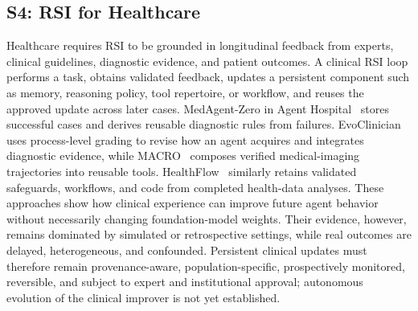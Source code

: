 \subsection{S4: RSI for Healthcare}
\label{subsec:healthcare-main}

Healthcare requires RSI to be grounded in longitudinal feedback from experts, clinical guidelines, diagnostic evidence, and patient outcomes. A clinical RSI loop performs a task, obtains validated feedback, updates a persistent component such as memory, reasoning policy, tool repertoire, or workflow, and reuses the approved update across later cases. MedAgent-Zero in Agent Hospital~\cite{li2024agenthospital} stores successful cases and derives reusable diagnostic rules from failures. EvoClinician~\cite{he2026evoclinician} uses process-level grading to revise how an agent acquires and integrates diagnostic evidence, while MACRO~\cite{fan2026macro} composes verified medical-imaging trajectories into reusable tools. HealthFlow~\cite{zhu2026healthflow} similarly retains validated safeguards, workflows, and code from completed health-data analyses. These approaches show how clinical experience can improve future agent behavior without necessarily changing foundation-model weights. Their evidence, however, remains dominated by simulated or retrospective settings, while real outcomes are delayed, heterogeneous, and confounded. Persistent clinical updates must therefore remain provenance-aware, population-specific, prospectively monitored, reversible, and subject to expert and institutional approval; autonomous evolution of the clinical improver is not yet established.
